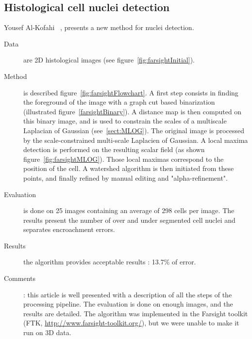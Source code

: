 \subsection*{Histological cell nuclei detection}
\label{sect:farsight}
Yousef Al-Kofahi {\etal}~\cite{al2009improved}, presents a new method for nuclei detection.
  \begin{description}
  \item[Data] are 2D histological images (see figure~\ref{fig:farsightInitial}).
  \item[Method] is described figure~\ref{fig:farsightFlowchart}.
  A first step consists in finding the foreground of the image with a graph cut based binarization (illustrated figure~\ref{farsightBinary}).
  A distance map is then computed on this binary image, and is used to constrain the scales of a multiscale Laplacian of Gaussian (see~\ref{sect:MLOG}).
  The original image is processed by the scale-constrained multi-scale Laplacien of Gaussian.
  A local maxima detection is performed on the resulting scalar field (as shown figure~\ref{fig:farsightMLOG}).
  Those local maximas correspond to the position of the cell.
  A watershed algorithm is then initiated from these points, and finally refined by manual editing and "alpha-refinement".
  \item[Evaluation] is done on 25 images containing an average of 298 cells per image. The results present the number of over and under segmented cell nuclei and separates encroachment errors.
  \item[Results] the algorithm provides acceptable results : 13.7\% of error.
  \item[Comments]: this article is well presented with a description of all the steps of the processing pipeline.
  The evaluation is done on enough images, and the results are detailed.
  The algorithm was implemented in the Farsight toolkit (FTK, \url{http://www.farsight-toolkit.org/}), but we were unable to make it run on 3D data.
\end{description}
